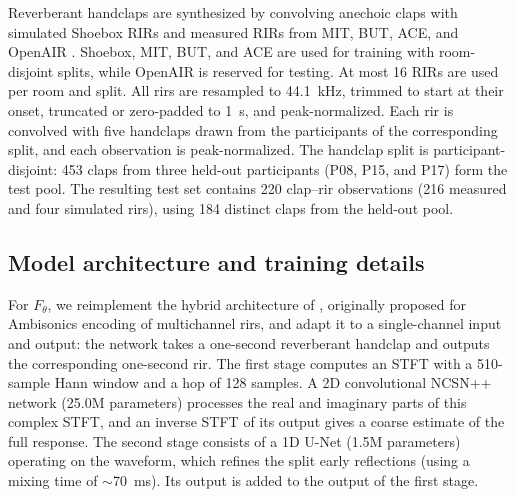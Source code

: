 \documentclass{article}
\begin{document}
Reverberant handclaps are synthesized by convolving anechoic claps with
simulated Shoebox RIRs and measured RIRs from MIT, BUT, ACE, and OpenAIR
\cite{mit,but,ace,OpenAIR}. Shoebox, MIT, BUT, and ACE are used for training
with room-disjoint splits, while OpenAIR is reserved for testing.
At most 16 RIRs are used per room and split.
All \acp{rir} are resampled to 44.1~kHz, trimmed to start at their onset, truncated or zero-padded to 1~s, and peak-normalized.
Each \ac{rir} is convolved with five handclaps drawn from the participants of the corresponding split, and each observation is peak-normalized.
The handclap split is participant-disjoint: 453 claps from three held-out participants (P08, P15, and P17) form the test pool.
The resulting test set contains 220 clap--\ac{rir} observations (216 measured and four simulated \acp{rir}), using 184 distinct claps from the held-out pool.

\subsection{Model architecture and training details} \label{sec:model_training}

For $F_\theta$, we reimplement the hybrid architecture of \cite{moliner2026ambisonics}, originally proposed for Ambisonics encoding of multichannel \acp{rir}, and adapt it to a single-channel input and output: the network takes a one-second reverberant handclap and outputs the corresponding one-second \ac{rir}.
The first stage computes an STFT with a 510-sample Hann window and a hop of 128 samples.
 A 2D convolutional NCSN++ network \cite{song2021sde} (25.0M parameters) processes the real and imaginary parts of this complex STFT, and an inverse STFT of its output gives a coarse estimate of the full response.
The second stage consists of a 1D U-Net (1.5M parameters) operating on the waveform, which refines the split early reflections (using a mixing time of $\sim$70~ms).
Its output is added to the output of the first stage. 
\end{document}
